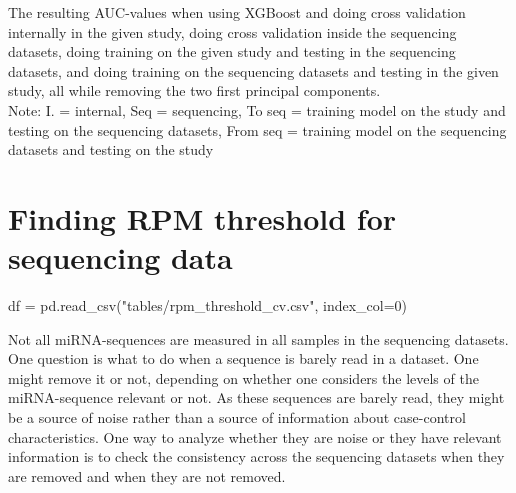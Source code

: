 {{{{{{{{{{{{\begin{table}
    \caption{The resulting AUC-values when using XGBoost and doing cross validation internally in the given study, doing cross validation inside the sequencing datasets, doing training on the given study and testing in the sequencing datasets, and doing training on the sequencing datasets and testing in the given study, all while removing the two first principal components. \\
    Note: I. = internal, Seq = sequencing, To seq = training model on the study and testing on the sequencing datasets, From seq = training model on the sequencing datasets and testing on the study}
    \label{tab:pca_remove_noise_pca}
    \begin{center}
    \end{center}
\end{table}

\section{Finding RPM threshold for sequencing data}
\label{sec:res_rpm_threshold}
\begin{pycode}
df = pd.read_csv("tables/rpm_threshold_cv.csv", index_col=0)
\end{pycode}
Not all miRNA-sequences are measured in all samples in the sequencing datasets. One question is what to do when a sequence is barely read in a dataset. One might remove it or not, depending on whether one considers the levels of the miRNA-sequence relevant or not. As these sequences are barely read, they might be a source of noise rather than a source of information about case-control characteristics. One way to analyze whether they are noise or they have relevant information is to check the consistency across the sequencing datasets when they are removed and when they are not removed.

}}}}}}}}}}}}
